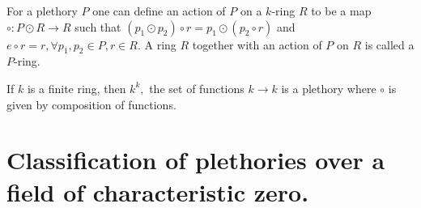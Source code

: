 \documentclass[a4paper, 12pt]{amsart}
\numberwithin{equation}{section}
\theoremstyle{definition}
\begin{document}
\begin{remark} \label{prings}

For a plethory $P$ one can define an action of $P$ on a $k$-ring $R$ to
be a map $\circ: P \odot R \rightarrow R$ such that $(p_1 \odot p_2)
\circ r = p_1 \odot (p_2 \circ r)$ and $e \circ r = r, \forall p_1,p_2
\in P, r\in R.$ A ring $R$ together with an action of $P$ on $R$ is called a $P$-ring.

\end{remark}

\begin{example}

If $k$ is a finite ring, then $k^k,$ the set of functions $k \rightarrow
k$ is a plethory where $\circ$ is given by composition of functions.

\end{example}
\section{Classification of plethories over a field of characteristic zero.}
\end{document}
